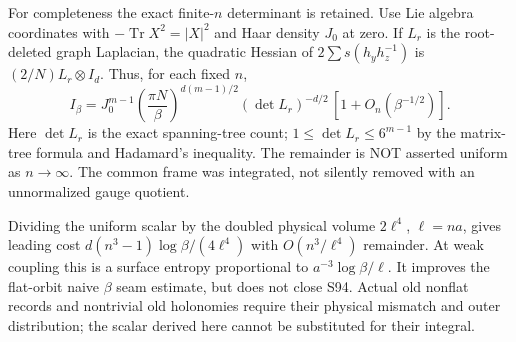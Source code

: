 \documentclass{article}
\begin{document}
For completeness the exact finite-$n$ determinant is retained. Use Lie algebra coordinates with $-\operatorname{Tr}X^2=|X|^2$ and Haar density $J_0$ at zero. If $L_r$ is the root-deleted graph Laplacian, the quadratic Hessian of $2\sum s(h_yh_z^{-1})$ is $(2/N)L_r\otimes I_d$. Thus, for each fixed $n$,
\[
 I_\beta=J_0^{m-1}\left(\frac{\pi N}{\beta}\right)^{d(m-1)/2}(\det L_r)^{-d/2}\,[1+O_n(\beta^{-1/2})].
\]
Here $\det L_r$ is the exact spanning-tree count; $1\le\det L_r\le6^{m-1}$ by the matrix-tree formula and Hadamard's inequality. The remainder is NOT asserted uniform as $n\to\infty$. The common frame was integrated, not silently removed with an unnormalized gauge quotient.

Dividing the uniform scalar by the doubled physical volume $2\ell^4$, $\ell=na$, gives leading cost $d(n^3-1)\log\beta/(4\ell^4)$ with $O(n^3/\ell^4)$ remainder. At weak coupling this is a surface entropy proportional to $a^{-3}\log\beta/\ell$. It improves the flat-orbit naive $\beta$ seam estimate, but does not close S94. Actual old nonflat records and nontrivial old holonomies require their physical mismatch and outer distribution; the scalar derived here cannot be substituted for their integral.
\end{document}
